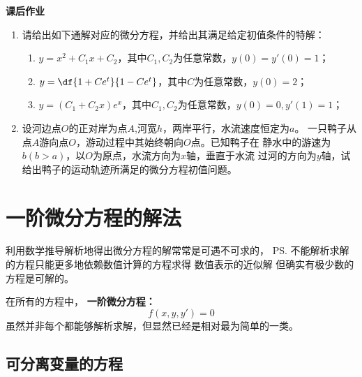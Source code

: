 \begin{ext}
	{\bf 课后作业}
	\begin{enumerate}
	  \item 请给出如下通解对应的微分方程，并给出其满足给定初值条件的特解：
	  \begin{enumerate}[(1)]
	    \item $y=x^2+C_1x+C_2$，其中$C_1,C_2$为任意常数，$y(0)=y'(0)=1$； 
	    \item $y=\df{1+Ce^t}{1-Ce^t}$，其中$C$为任意常数，$y(0)=2$；
	    \item $y=(C_1+C_2x)e^x$，其中$C_1,C_2$为任意常数，$y(0)=0,y'(1)=1$；
	  \end{enumerate}
	  \item 设河边点$O$的正对岸为点$A$,河宽$h$，两岸平行，水流速度恒定为$a$。
	  一只鸭子从点$A$游向点$O$，游动过程中其始终朝向$O$点。已知鸭子在
	  静水中的游速为$b(b>a)$，以$O$为原点，水流方向为$x$轴，垂直于水流
	  过河的方向为$y$轴，试给出鸭子的运动轨迹所满足的微分方程初值问题。
	\end{enumerate}
\end{ext}

\section{一阶微分方程的解法}

利用数学推导解析地得出微分方程的解常常是可遇不可求的，
\ps{不能解析求解的方程只能更多地依赖数值计算的方程求得
数值表示的近似解}
但确实有极少数的方程是可解的。

在所有的方程中， {\bf 一阶微分方程：}
$$f(x,y,y')=0$$
虽然并非每个都能够解析求解，但显然已经是相对最为简单的一类。
 

\subsection{可分离变量的方程}

